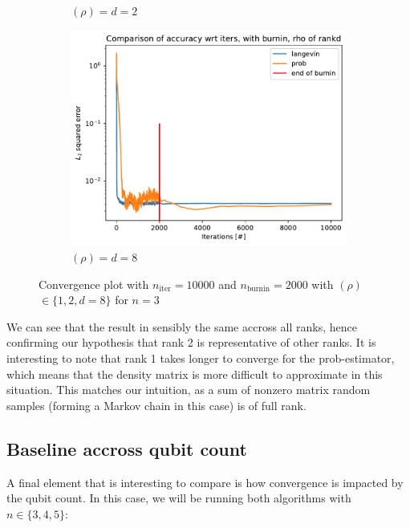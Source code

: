 \documentclass[12pt]{memoir}
\newcommand{\nitern}[1]{$n_{\text{iter}}=#1$}
\newcommand{\nburninn}[1]{$n_{\text{burnin}}=#1$}
\newcommand{\rhorankn}[1]{\text{rank}$(\rho)=#1$}
\newcommand{\rhorank}[0]{\text{rank}$(\rho) $ }
\begin{document}
\begin{figure}[H]
\begin{subfigure}[b]{0.49\textwidth}
        \caption{\rhorankn{d=2}}
        \label{fig:conv-plot-diff-rank-2-sub}
    \end{subfigure}
    \begin{subfigure}[b]{0.49\textwidth}
        \centering
        \includegraphics[width=\textwidth]{figures/experiments/baseline/diff_rank/iters_acc_comp_iters_no_avg_rankd-1.png}
        \caption{\rhorankn{d=8}}
        \label{fig:conv-plot-diff-rank-d-sub}
    \end{subfigure}
    \caption{Convergence plot with \nitern{10000} and \nburninn{2000} with \rhorank $\in \{1,2,d=8\}$ for $n=3$  }
    \label{fig:conv-plot-diff-rank}
\end{figure}

We can see that the result in sensibly the same accross all ranks, hence confirming our hypothesis that rank 2 is representative of other ranks. It is interesting to note that rank 1 takes longer to converge for the prob-estimator, which means that the density matrix is more difficult to approximate in this situation. This matches our intuition, as a sum of nonzero matrix random samples (forming a Markov chain in this case) is of full rank.

\subsection*{Baseline accross qubit count}

A final element that is interesting to compare is how convergence is impacted by the qubit count. In this case, we will be running both algorithms with $n\in\{3,4,5\}$:
\end{document}

